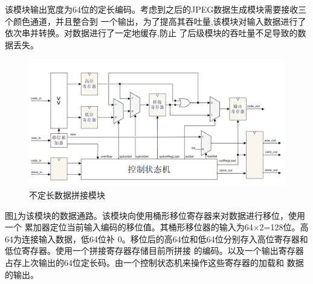 \documentclass{article}
\numberwithin {equation}{section}
\begin{document}
\begin{spacing}{1.25}
      该模块输出宽度为64位的定长编码。考虑到之后的JPEG数据生成模块需要接收三个颜色通道，并且整合到
      一个输出，为了提高其吞吐量,该模块对输入数据进行了依次串并转换。对数据进行了一定地缓存,防止
      了后级模块的吞吐量不足导致的数据丢失。
      \begin{figure}[H]
        \centering
        \includegraphics[scale=0.4]{./pictures/拼接模块.png}
        \caption{不定长数据拼接模块}
        \label{spliceModule}
      \end{figure}

      图\ref{spliceModule}为该模块的数据通路。该模块向使用桶形移位寄存器来对数据进行移位，使用一个
      累加器定位当前输入编码的移位值。其桶形移位器的输入为64×2=128位。高64为连接输入数据，低64位补
      0。移位后的高64位和低64位分别存入高位寄存器和低位寄存器。使用一个拼接寄存器存储目前所拼接
      的编码。以及一个输出寄存器占存上次输出的64位定长码。由一个控制状态机来操作这些寄存器的加载和
      数据的输出。


\end{spacing}
\end{document}
